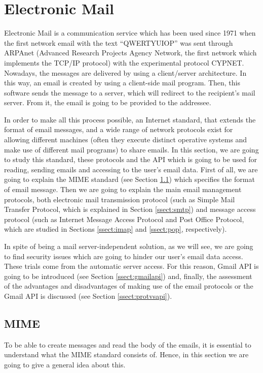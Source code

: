 \section{Electronic Mail}
Electronic Mail \citep[Chapter 11]{redhatemail} is a communication service which has been used since 1971 \citep{wikiemail} when the first network email with the text ``QWERTYUIOP'' was sent through ARPAnet (Advanced Research Projects Agency Network, the first network which implements the TCP/IP protocol) with the experimental protocol CYPNET. Nowadays, the messages are delivered by using a client/server architecture. In this way, an email is created by using a client-side mail program. Then, this software sends the message to a server, which will redirect to the recipient's mail server. From it, the email is going to be provided to the addressee.

In order to make all this process possible, an Internet standard, that extends the format of email messages, and a wide range of network protocols exist for allowing different machines (often they execute distinct operative systems and make use of different mail programs) to share emails. In this section, we are going to study this standard, these protocols and the API which is going to be used for reading, sending emails and accessing to the user's email data. First of all, we are going to explain the MIME standard (see Section \ref{ssect:mime}) which specifies the format of email message. Then we are going to explain the main email management protocols, both electronic mail transmission protocol (such as Simple Mail Transfer Protocol, which is explained in Section \ref{ssect:smtp}) and message access protocol (such as Internet Message Access Protocol and Post Office Protocol, which are studied in Sections \ref{ssect:imap} and \ref{ssect:pop}, respectively). 

In spite of being a mail server-independent solution, as we will see, we are going to find security issues which are going to hinder our user's email data access. These trials come from the automatic server access. For this reason, Gmail API is going to be introduced (see Section \ref{ssect:gmailapi}) and, finally, the assessment of the advantages and disadvantages of making use of the email protocols or the Gmail API is discussed (see Section \ref{ssect:protvsapi}).

\subsection{MIME} \label{ssect:mime}
To be able to create messages and read the body of the emails, it is essential to understand what the MIME standard consists of. Hence, in this section we are going to give a general idea about this.

